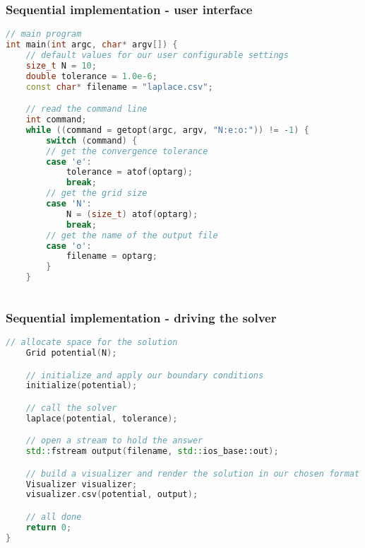 %
%
%
%


\begin{frame}[fragile]
%
  \frametitle{Sequential implementation - user interface}
%
  \begin{lstlisting}[language=c++,name=seq:frame,firstnumber=77]
// main program
int main(int argc, char* argv[]) {
    // default values for our user configurable settings
    size_t N = 10;
    double tolerance = 1.0e-6;
    const char* filename = "laplace.csv";

    // read the command line
    int command;
    while ((command = getopt(argc, argv, "N:e:o:")) != -1) {
        switch (command) {
        // get the convergence tolerance
        case 'e':
            tolerance = atof(optarg);
            break;
        // get the grid size
        case 'N':
            N = (size_t) atof(optarg);
            break;
        // get the name of the output file
        case 'o':
            filename = optarg;
        }
    }
    
  \end{lstlisting}
% 
\end{frame}

\begin{frame}[fragile]
%
  \frametitle{Sequential implementation - driving the solver}
%
  \begin{lstlisting}[language=c++,name=seq:frame]
    // allocate space for the solution
    Grid potential(N);

    // initialize and apply our boundary conditions
    initialize(potential);

    // call the solver
    laplace(potential, tolerance);

    // open a stream to hold the answer
    std::fstream output(filename, std::ios_base::out);

    // build a visualizer and render the solution in our chosen format
    Visualizer visualizer;
    visualizer.csv(potential, output);

    // all done
    return 0;
}
  \end{lstlisting}
% 
\end{frame}

